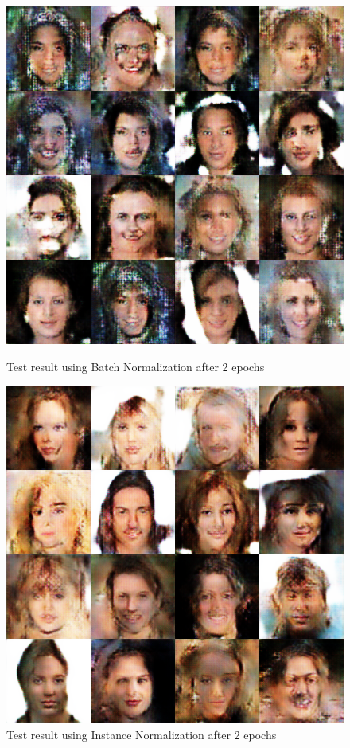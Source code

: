 \begin{figure}
    \begin{minipage}[t]{0.48\linewidth}
        \centering
        \includegraphics[width=\textwidth]{figures/result_norm_batch.png}
        \caption{Test result using Batch Normalization after 2 epochs}
        \label{norm_bach}
    \end{minipage}
        \hfill
    \begin{minipage}[t]{0.48\linewidth}
        \centering
        \includegraphics[width=\textwidth]{figures/result_norm_instance.png}
        \caption{Test result using Instance Normalization after 2 epochs}
        \label{norm_instance}
    \end{minipage}
\end{figure}

